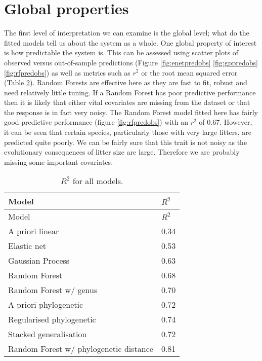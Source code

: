 \documentclass[10pt,]{article}
\begin{document}
\section{Global properties}\label{global-properties}

The first level of interpretation we can examine is the global level; what do the fitted models tell us about the system as a whole. One global property of interest is how predictable the system is. This can be assessed using scatter plots of observed versus out-of-sample predictions (Figure \ref{fig:enetpredobs} \ref{fig:gppredobs} \ref{fig:rfpredobs}) as well as metrics such as \(r^2\) or the root mean squared error (Table \ref{tbl:allr2}). Random Forests are effective here as they are fast to fit, robust and need relatively little tuning. If a Random Forest has poor predictive performance then it is likely that either vital covariates are missing from the dataset or that the response is in fact very noisy. The Random Forest model fitted here has fairly good predictive performance (figure \ref{fig:rfpredobs}) with an \(r^2\) of 0.67. However, it can be seen that certain species, particularly those with very large litters, are predicted quite poorly. We can be fairly sure that this trait is not noisy as the evolutionary consequences of litter size are large. Therefore we are probably missing some important covariates.

\begin{table}[t!]
\begin{longtable}[c]{@{}ll@{}}
\caption{\(R^2\) for all models. \label{tbl:allr2}}\tabularnewline
\toprule
Model & \(R^2\)\tabularnewline
\midrule
\endfirsthead
\toprule
Model & \(R^2\)\tabularnewline
\midrule
\endhead
A priori linear & 0.34\tabularnewline
Elastic net & 0.53\tabularnewline
Gaussian Process & 0.63\tabularnewline
Random Forest & 0.68\tabularnewline
Random Forest w/ genus & 0.70\tabularnewline
A priori phylogenetic & 0.72\tabularnewline
Regularised phylogenetic & 0.74\tabularnewline
Stacked generalisation & 0.72\tabularnewline
Random Forest w/ phylogenetic distance & 0.81\tabularnewline
\bottomrule
\end{longtable}
\end{table}
\end{document}
